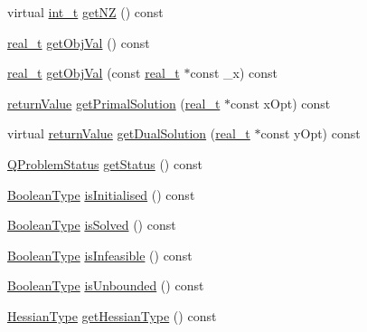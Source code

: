 \begin{DoxyCompactItemize}
\item 
virtual \hyperlink{_types_8hpp_ab6fd6105e64ed14a0c9281326f05e623}{int\+\_\+t} \hyperlink{class_q_problem_b_a3495286868b8a38e788700ad0e64fbc4}{get\+NZ} () const
\item 
\hyperlink{qp_o_a_s_e_s__wrapper_8h_a0d00e2b3dfadee81331bbb39068570c4}{real\+\_\+t} \hyperlink{class_q_problem_b_a067695062de64eb612ba1d0e1cfaac45}{get\+Obj\+Val} () const
\item 
\hyperlink{qp_o_a_s_e_s__wrapper_8h_a0d00e2b3dfadee81331bbb39068570c4}{real\+\_\+t} \hyperlink{class_q_problem_b_ae84a514dbacfaa501db053a4c4c6093e}{get\+Obj\+Val} (const \hyperlink{qp_o_a_s_e_s__wrapper_8h_a0d00e2b3dfadee81331bbb39068570c4}{real\+\_\+t} $\ast$const \+\_\+x) const
\item 
\hyperlink{_message_handling_8hpp_a81d556f613bfbabd0b1f9488c0fa865e}{return\+Value} \hyperlink{class_q_problem_b_a979e1f541b8e894a3dfd9ec37f95458e}{get\+Primal\+Solution} (\hyperlink{qp_o_a_s_e_s__wrapper_8h_a0d00e2b3dfadee81331bbb39068570c4}{real\+\_\+t} $\ast$const x\+Opt) const
\item 
virtual \hyperlink{_message_handling_8hpp_a81d556f613bfbabd0b1f9488c0fa865e}{return\+Value} \hyperlink{class_q_problem_b_aed886c847f0f18259726d758e7d24abe}{get\+Dual\+Solution} (\hyperlink{qp_o_a_s_e_s__wrapper_8h_a0d00e2b3dfadee81331bbb39068570c4}{real\+\_\+t} $\ast$const y\+Opt) const
\item 
\hyperlink{_types_8hpp_a8d5ce5a92124dc0106a5720f6d9a5abd}{Q\+Problem\+Status} \hyperlink{class_q_problem_b_a85b382973fc35fa5b3e7eed6bde01379}{get\+Status} () const
\item 
\hyperlink{_types_8hpp_a20f82124c82b6f5686a7fce454ef9089}{Boolean\+Type} \hyperlink{class_q_problem_b_ada1bc8c33c22ccc4ce6b9ca681098e44}{is\+Initialised} () const
\item 
\hyperlink{_types_8hpp_a20f82124c82b6f5686a7fce454ef9089}{Boolean\+Type} \hyperlink{class_q_problem_b_a5c7b1368dde6de4c7c5858c400782044}{is\+Solved} () const
\item 
\hyperlink{_types_8hpp_a20f82124c82b6f5686a7fce454ef9089}{Boolean\+Type} \hyperlink{class_q_problem_b_a2a69e2654a4275e50c2e959f19de7ce3}{is\+Infeasible} () const
\item 
\hyperlink{_types_8hpp_a20f82124c82b6f5686a7fce454ef9089}{Boolean\+Type} \hyperlink{class_q_problem_b_a869703c445e0eb4a324da44479c2d67f}{is\+Unbounded} () const
\item 
\hyperlink{_types_8hpp_a604cad5cda14e378ce4a77ab28ee9fd9}{Hessian\+Type} \hyperlink{class_q_problem_b_a4658fef144420003235925f5a4683217}{get\+Hessian\+Type} () const

\end{DoxyCompactItemize}
